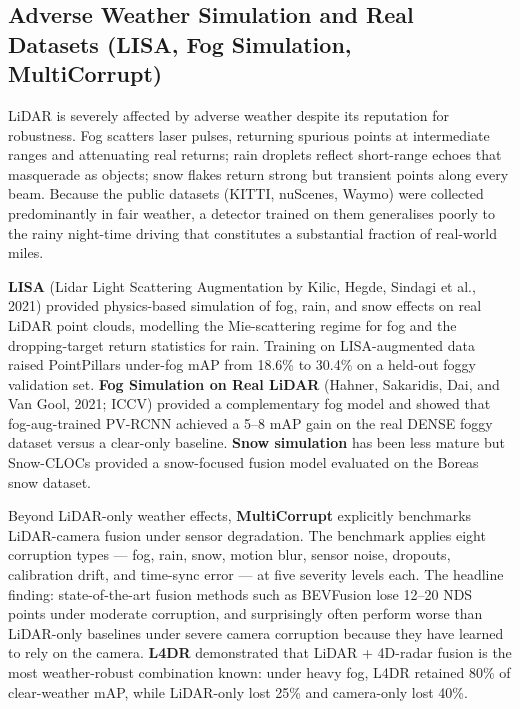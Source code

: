 \documentclass{article}
\begin{document}
\subsection{Adverse Weather Simulation and Real Datasets (LISA, Fog Simulation, MultiCorrupt)}\label{adverse-weather-simulation-and-real-datasets-lisa-fog-simulation-multicorrupt}

LiDAR is severely affected by adverse weather despite its reputation for robustness. Fog scatters laser pulses, returning spurious points at intermediate ranges and attenuating real returns; rain droplets reflect short-range echoes that masquerade as objects; snow flakes return strong but transient points along every beam. Because the public datasets (KITTI, nuScenes, Waymo) were collected predominantly in fair weather, a detector trained on them generalises poorly to the rainy night-time driving that constitutes a substantial fraction of real-world miles.

\textbf{LISA} (Lidar Light Scattering Augmentation by Kilic, Hegde, Sindagi et al., 2021) provided physics-based simulation of fog, rain, and snow effects on real LiDAR point clouds, modelling the Mie-scattering regime for fog and the dropping-target return statistics for rain. Training on LISA-augmented data raised PointPillars under-fog mAP from 18.6\% to 30.4\% on a held-out foggy validation set. \textbf{Fog Simulation on Real LiDAR} (Hahner, Sakaridis, Dai, and Van Gool, 2021; ICCV) provided a complementary fog model and showed that fog-aug-trained PV-RCNN achieved a 5--8 mAP gain on the real DENSE foggy dataset versus a clear-only baseline. \textbf{Snow simulation} has been less mature but Snow-CLOCs \citep{fan2023supersparse3dobjec} provided a snow-focused fusion model evaluated on the Boreas snow dataset.

Beyond LiDAR-only weather effects, \textbf{MultiCorrupt} \citep{beemelmanns2024multicorruptamulti} explicitly benchmarks LiDAR-camera fusion under sensor degradation. The benchmark applies eight corruption types --- fog, rain, snow, motion blur, sensor noise, dropouts, calibration drift, and time-sync error --- at five severity levels each. The headline finding: state-of-the-art fusion methods such as BEVFusion lose 12--20 NDS points under moderate corruption, and surprisingly often perform worse than LiDAR-only baselines under severe camera corruption because they have learned to rely on the camera. \textbf{L4DR} \citep{huang2024l4drlidar4dradarfu} demonstrated that LiDAR + 4D-radar fusion is the most weather-robust combination known: under heavy fog, L4DR retained 80\% of clear-weather mAP, while LiDAR-only lost 25\% and camera-only lost 40\%.
\end{document}
